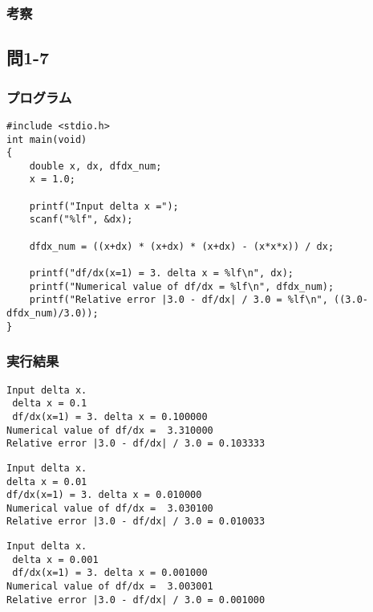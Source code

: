 \documentclass{jarticle}
\begin{document}
\subsubsection{考察\\}

\subsection{問1-7\\}
\subsubsection{プログラム\\}
\begin{breakbox}
\begin{verbatim}
#include <stdio.h>
int main(void)
{
    double x, dx, dfdx_num;
    x = 1.0;
    
    printf("Input delta x =");
    scanf("%lf", &dx);
    
    dfdx_num = ((x+dx) * (x+dx) * (x+dx) - (x*x*x)) / dx;
    
    printf("df/dx(x=1) = 3. delta x = %lf\n", dx);
    printf("Numerical value of df/dx = %lf\n", dfdx_num);
    printf("Relative error |3.0 - df/dx| / 3.0 = %lf\n", ((3.0-dfdx_num)/3.0));
}
\end{verbatim}
\end{breakbox}

\subsubsection{実行結果\\}
\begin{breakbox}
\begin{verbatim}
Input delta x. 
 delta x = 0.1 
 df/dx(x=1) = 3. delta x = 0.100000 
Numerical value of df/dx =  3.310000 
Relative error |3.0 - df/dx| / 3.0 = 0.103333 
\end{verbatim}
\end{breakbox}

\begin{breakbox}
\begin{verbatim}
Input delta x. 
delta x = 0.01
df/dx(x=1) = 3. delta x = 0.010000 
Numerical value of df/dx =  3.030100 
Relative error |3.0 - df/dx| / 3.0 = 0.010033 
\end{verbatim}
\end{breakbox}

\begin{breakbox}
\begin{verbatim}
Input delta x. 
 delta x = 0.001 
 df/dx(x=1) = 3. delta x = 0.001000 
Numerical value of df/dx =  3.003001 
Relative error |3.0 - df/dx| / 3.0 = 0.001000 
\end{verbatim}
\end{breakbox}
\end{document}
